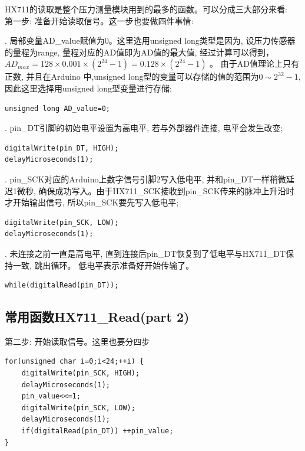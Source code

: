\documentclass{article}
\begin{document}
HX711的读取是整个压力测量模块用到的最多的函数。可以分成三大部分来看:\\
\noindent 第一步: 准备开始读取信号。这一步也要做四件事情:

\noindent \uppercase\expandafter{}. 局部变量AD\_value赋值为0。这里选用unsigned long类型是因为, 
设压力传感器的量程为range, 量程对应的AD值即为AD值的最大值, 经过计算可以得到，$AD_{max} = 128 \times 0.001 \times (2^{24}-1) = 0.128 \times (2^{24}-1)$ 。
由于AD值理论上只有正数, 并且在Arduino 中,unsigned long型的变量可以存储的值的范围为$0\sim2^{32}-1$,
因此这里选择用unsigned long型变量进行存储;

\begin{lstlisting}
unsigned long AD_value=0;
\end{lstlisting}	

\noindent \uppercase\expandafter{}. pin\_DT引脚的初始电平设置为高电平, 若与外部器件连接, 电平会发生改变;

\begin{lstlisting}
digitalWrite(pin_DT, HIGH);
delayMicroseconds(1);
\end{lstlisting}	

\noindent \uppercase\expandafter{}. pin\_SCK对应的Arduino上数字信号引脚2写入低电平, 
并和pin\_DT一样稍微延迟1微秒, 确保成功写入。由于HX711\_SCK接收到pin\_SCK传来的脉冲上升沿时才开始输出信号,
所以pin\_SCK要先写入低电平;

\begin{lstlisting}
digitalWrite(pin_SCK, LOW);
delayMicroseconds(1);
\end{lstlisting}

\noindent \uppercase\expandafter{}. 未连接之前一直是高电平, 直到连接后pin\_DT恢复到了低电平与HX711\_DT保持一致, 跳出循环。
低电平表示准备好开始传输了。
\begin{lstlisting}
while(digitalRead(pin_DT));
\end{lstlisting}

\subsection{常用函数HX711\_Read(part 2)}
\noindent 第二步: 开始读取信号。这里也要分四步
\begin{lstlisting}
for(unsigned char i=0;i<24;++i) {
	digitalWrite(pin_SCK, HIGH); 
	delayMicroseconds(1);
	pin_value<<=1; 
	digitalWrite(pin_SCK, LOW); 
	delayMicroseconds(1);
	if(digitalRead(pin_DT)) ++pin_value; 
} 
\end{lstlisting}
\end{document}
